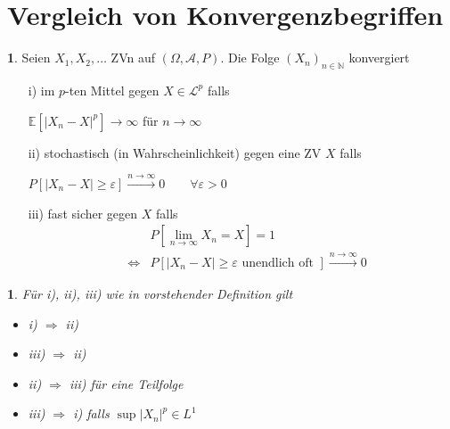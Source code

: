 \documentclass[10pt,a4paper]{report}
\newcommand{\E}{\mathbb{E}}
\newcommand{\N}{\mathbb{N}}
\numberwithin{equation}{section}
\numberwithin{figure}{section}
\theoremstyle{plain}
\theoremstyle{definition}
\newtheorem{defn}[thm]{\protect\definitionname}
\theoremstyle{remark}
\theoremstyle{plain}
\newtheorem{prop}[thm]{\protect\propositionname}
\providecommand{\definitionname}{Definition}
\providecommand{\propositionname}{Satz}
\newcommand{\1}{ \mathbb{1} } %
\begin{document}
\section{Vergleich von Konvergenzbegriffen}
\label{sec:konvergenz}
\begin{defn}  
  Seien $X_1,X_2,\ldots$ ZVn auf $(\Omega,\mathcal{A},P)$. Die Folge
  $(X_n)_{n \in \N}$ konvergiert
  \begin{itemize}
  \item[i)] im $p$-ten Mittel gegen $X \in \mathcal{L}^p$ falls
    \begin{center}
      $\E[|X_n-X|^p] \to \infty$ für $n \to \infty$
    \end{center}
  \item[ii)] stochastisch (in Wahrscheinlichkeit) gegen eine ZV $X$
    falls
    \begin{center}
      $P[|X_n-X|\geq \varepsilon ] \overset{n \to \infty}{\to} 0\qquad
      \forall \varepsilon >0$
    \end{center}
  \item[iii)] fast sicher gegen $X$ falls
    \begin{eqnarray*}
      && P\left[\lim\limits_{n \to \infty}X_n=X \right]=1\\
      &\Leftrightarrow &P[|X_n-X|\geq \varepsilon \text{ unendlich oft }] \overset{n \to \infty}{\to} 0
    \end{eqnarray*}
  \end{itemize}
\end{defn}
\begin{prop}
  Für i), ii), iii) wie in vorstehender Definition gilt
  \begin{itemize}
  \item i) $\Rightarrow$ ii)
  \item iii) $\Rightarrow$ ii)
  \item ii) $\Rightarrow$ iii) für eine Teilfolge
  \item iii) $\Rightarrow$ i) falls $\sup|X_n|^p \in L^1$
  \end{itemize}
\end{prop}
\end{document}
